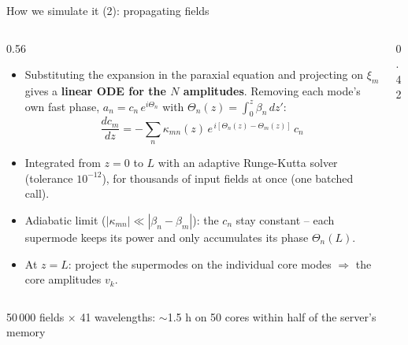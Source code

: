 \documentclass[aspectratio=169,10pt]{beamer}
\newcommand{\src}[1]{\par\vfill\hfill{\tiny\color{gray}#1}}
\begin{document}
\begin{frame}{How we simulate it (2): propagating fields}
\begin{columns}[T]
\begin{column}{0.56\textwidth}
\small
\begin{itemize}
    \item Substituting the expansion in the paraxial equation and projecting on $\xi_m$ gives a
          \textbf{linear ODE for the $N$ amplitudes}. Removing each mode's own fast phase,
          $a_n = c_n\,e^{i\Theta_n}$ with $\Theta_n(z) = \int_0^z \beta_n\,dz'$:
          \[ \frac{dc_m}{dz} = -\sum_n \kappa_{mn}(z)\,e^{\,i[\Theta_n(z) - \Theta_m(z)]}\,c_n \]
    \item Integrated from $z=0$ to $L$ with an adaptive Runge-Kutta solver (tolerance
          $10^{-12}$), for thousands of input fields at once (one batched call).
    \item Adiabatic limit ($|\kappa_{mn}| \ll |\beta_n - \beta_m|$): the $c_n$ stay constant --
          each supermode keeps its power and only accumulates its phase $\Theta_n(L)$.
    \item At $z = L$: project the supermodes on the individual core modes $\Rightarrow$ the core
          amplitudes $v_k$.
\end{itemize}
\end{column}
\begin{column}{0.42\textwidth}
\centering
{}
\end{column}
\end{columns}
\src{50\,000 fields $\times$ 41 wavelengths: $\sim$1.5 h on 50 cores within half of the server's memory}
\end{frame}
\end{document}
